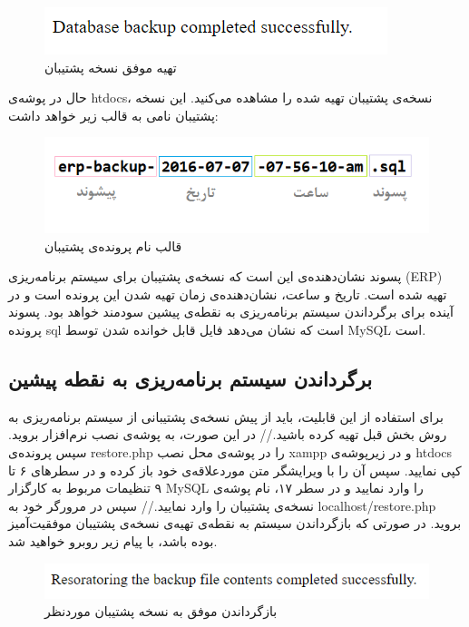 \begin{figure}[H]
	\centering
	\includegraphics[scale=0.7]{img/manual/backup}
	\caption{تهیه موفق نسخه پشتیبان}
\end{figure}

حال در پوشه‌ی htdocs، نسخه‌ی پشتیبان تهیه شده را مشاهده می‌کنید. این نسخه پشتیبان نامی به قالب زیر خواهد داشت:

\begin{figure}[H]
	\centering
	\includegraphics[scale=0.7]{img/manual/name}
	\caption{قالب نام پرونده‌ی پشتیبان}
\end{figure}

پسوند نشان‌دهنده‌ی این است که نسخه‌ی پشتیبان برای سیستم برنامه‌ریزی (ERP) تهیه شده است. تاریخ و ساعت، نشان‌دهنده‌ی زمان تهیه شدن این پرونده است و در آینده برای برگرداندن سیستم برنامه‌ریزی به نقطه‌ی پیشین سودمند خواهد بود. پسوند پرونده sql است که نشان می‌دهد فایل قابل خوانده شدن توسط MySQL است.

\subsection{برگرداندن سیستم برنامه‌ریزی به نقطه پیشین}
برای استفاده از این قابلیت، باید از پیش نسخه‌ی پشتیبانی از سیستم برنامه‌ریزی به روش بخش قبل تهیه کرده باشید.//
در این صورت، به پوشه‌ی نصب نرم‌افزار بروید. سپس پرونده‌ی restore.php را در پوشه‌ی محل نصب xampp و در زیرپوشه‌ی htdocs کپی نمایید. سپس آن را با ویرایشگر متن موردعلاقه‌ی خود باز کرده و در سطرهای ۶ تا ۹ تنظیمات مربوط به کارگزار MySQL را وارد نمایید و در سطر ۱۷، نام پوشه‌ی نسخه‌ی پشتیبان را وارد نمایید.//
سپس در مرورگر خود به  localhost/restore.php بروید. در صورتی که  بازگرداندن سیستم به نقطه‌ی تهیه‌ی نسخه‌ی پشتیبان موفقیت‌آمیز بوده باشد، با پیام زیر روبرو خواهید شد.
\begin{figure}[H]
	\centering
	\includegraphics[scale=0.7]{img/manual/restore}
	\caption{بازگرداندن موفق به نسخه پشتیبان موردنظر}
\end{figure}




